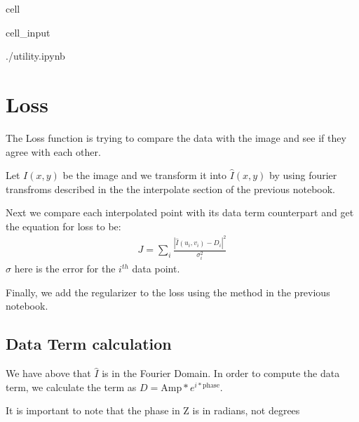 \documentclass[letterpaper,10pt,english]{jupyterBook}
\begin{document}
\begin{sphinxuseclass}{cell}\begin{sphinxVerbatimInput}

\begin{sphinxuseclass}{cell_input}
\begin{sphinxVerbatim}[commandchars=\\\{\}]
 ./utility.ipynb
\end{sphinxVerbatim}

\end{sphinxuseclass}\end{sphinxVerbatimInput}

\end{sphinxuseclass}

\chapter{Loss}
\label{\detokenize{loss:loss}}\label{\detokenize{loss::doc}}
\sphinxAtStartPar
The Loss function is trying to compare the data with the image and see if they agree with each other.

\sphinxAtStartPar
Let \(I(x,y)\) be the image and we transform it into \(\hat{I} (x,y)\) by using fourier transfroms described in the the interpolate section of the previous notebook.

\sphinxAtStartPar
Next we compare each interpolated point with its data term counterpart and get the equation for loss to be:
\begin{equation*}
\begin{split}J = \sum_{i}\frac{|\hat{I}(u_i,v_i) - D_i|^2}{\sigma_i^2}\end{split}
\end{equation*}
\sphinxAtStartPar
\(\sigma\) here is the error for the \(i^{th}\) data point.

\sphinxAtStartPar
Finally, we add the regularizer to the loss using the method in the previous notebook.


\section{Data Term calculation}
\label{\detokenize{loss:data-term-calculation}}
\sphinxAtStartPar
We have above that \(\hat{I}\) is in the Fourier Domain. In order to compute the data term, we calculate the term as \(D = \text{Amp} * e^{i*\text{phase}}\).

\sphinxAtStartPar
It is important to note that the phase in Z is in radians, not degrees
\end{document}

